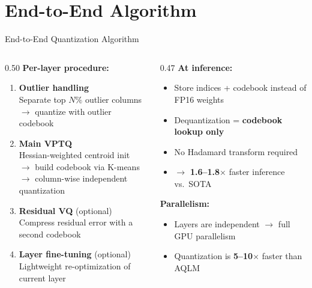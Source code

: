 \section{End-to-End Algorithm}

\begin{frame}{End-to-End Quantization Algorithm}
  \begin{columns}[T]
    \begin{column}{0.50\textwidth}
      \textbf{Per-layer procedure:}
      \begin{enumerate}
        \small
        \item \textbf{Outlier handling}\\
          Separate top $N\%$ outlier columns\\
          $\rightarrow$ quantize with outlier codebook
        \item \textbf{Main VPTQ}\\
          Hessian-weighted centroid init\\
          $\rightarrow$ build codebook via K-means\\
          $\rightarrow$ column-wise independent quantization
        \item \textbf{Residual VQ} (optional)\\
          Compress residual error with a second codebook
        \item \textbf{Layer fine-tuning} (optional)\\
          Lightweight re-optimization of current layer
      \end{enumerate}
    \end{column}
    \begin{column}{0.47\textwidth}
      \textbf{At inference:}
      \begin{itemize}
        \small
        \item Store indices + codebook instead of FP16 weights
        \item Dequantization = \textbf{codebook lookup only}
        \item No Hadamard transform required
        \item $\rightarrow$ \textbf{1.6--1.8$\times$} faster inference vs.\ SOTA
      \end{itemize}
      \vspace{0.5em}
      \textbf{Parallelism:}
      \begin{itemize}
        \small
        \item Layers are independent $\rightarrow$ full GPU parallelism
        \item Quantization is \textbf{5--10$\times$} faster than AQLM
      \end{itemize}
    \end{column}
  \end{columns}
\end{frame}

